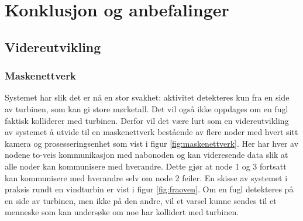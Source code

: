 \section{Konklusjon og anbefalinger}
\label{sec:konklusjon}


\subsection{Videreutvikling}

\subsubsection{Maskenettverk}

Systemet har slik det er nå en stor svakhet: aktivitet detekteres kun fra en side av turbinen, som kan gi store mørketall. Det vil også ikke oppdages om en fugl faktisk kolliderer med turbinen. Derfor vil det være lurt som en videreutvikling av systemet å utvide til en maskenettverk bestående av flere noder med hvert sitt kamera og prosesseringsenhet som vist i figur \ref{fig:maskenettverk}. Her har hver av nodene to-veis kommunikasjon med nabonoden og kan videresende data slik at alle noder kan kommunisere med hverandre. Dette gjør at node 1 og 3 fortsatt kan kommunisere med hverandre selv om node 2 feiler. En skisse av systemet i praksis rundt en vindturbin er vist i figur \ref{fig:fraoven}. Om en fugl detekteres på en side av turbinen, men ikke på den andre, vil et varsel kunne sendes til et menneske som kan undersøke om noe har kollidert med turbinen.


